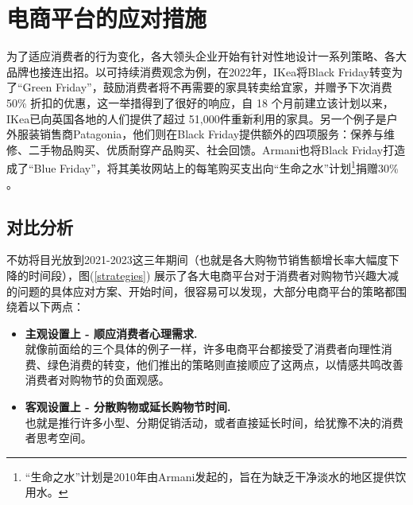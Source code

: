 \documentclass[12pt]{ctexart}
\begin{document}
\section{电商平台的应对措施}

为了适应消费者的行为变化，各大领头企业开始有针对性地设计一系列策略、各大品牌也接连出招。以可持续消费观念为例，在2022年，IKea将Black Friday转变为了“Green Friday”，鼓励消费者将不再需要的家具转卖给宜家，并赠予下次消费 50\% 折扣的优惠，这一举措得到了很好的响应，自 18 个月前建立该计划以来，IKea已向英国各地的人们提供了超过 51,000件重新利用的家具。另一个例子是户外服装销售商Patagonia，他们则在Black Friday提供额外的四项服务：保养与维修、二手物品购买、优质耐穿产品购买、社会回馈。Armani也将Black Friday打造成了“Blue Friday”，将其美妆网站上的每笔购买支出向“生命之水”计划\footnote{“生命之水”计划是2010年由Armani发起的，旨在为缺乏干净淡水的地区提供饮用水。}捐赠30\% \cite{22}。

\subsection{对比分析}
不妨将目光放到2021-2023这三年期间（也就是各大购物节销售额增长率大幅度下降的时间段），图(\ref{strategies}) 展示了各大电商平台对于消费者对购物节兴趣大减的问题的具体应对方案、开始时间，很容易可以发现，大部分电商平台的策略都围绕着以下两点：
\begin{itemize}
    \item \textbf{主观设置上 - 顺应消费者心理需求.} \\
    就像前面给的三个具体的例子一样，许多电商平台都接受了消费者向理性消费、绿色消费的转变，他们推出的策略则直接顺应了这两点，以情感共鸣改善消费者对购物节的负面观感。
    \item \textbf{客观设置上 - 分散购物或延长购物节时间.} \\
    也就是推行许多小型、分期促销活动，或者直接延长时间，给犹豫不决的消费者思考空间。
\end{itemize}
\end{document}
